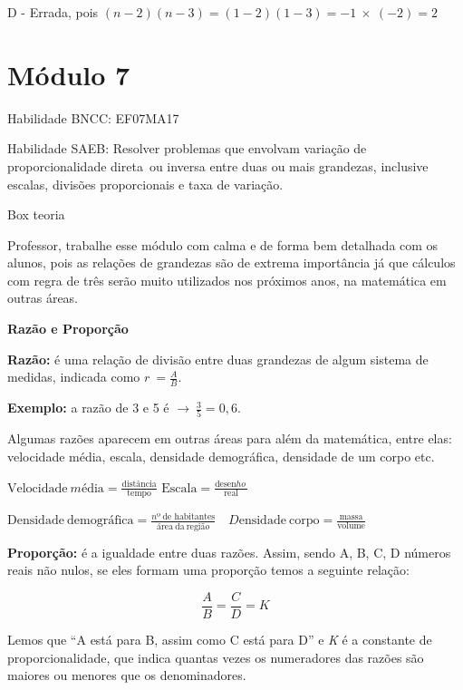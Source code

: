 {{{{{{D - Errada, pois
\(\left( n - 2 \right)\left( n - 3 \right) = \left( 1 - 2 \right)\left( 1 - 3 \right) = - 1\  \times \ ( - 2) = 2\)

\hypertarget{muxf3dulo-7}{%
\section{Módulo 7}

Habilidade BNCC: EF07MA17

Habilidade SAEB: Resolver problemas que envolvam variação de
proporcionalidade direta~ou inversa entre duas ou mais grandezas,
inclusive escalas, divisões proporcionais e taxa de variação.

Box teoria

Professor, trabalhe esse módulo com calma e de forma bem detalhada com
os alunos, pois as relações de grandezas são de extrema importância já
que cálculos com regra de três serão muito utilizados nos próximos anos,
na matemática em outras áreas.

\textbf{Razão e Proporção}

\textbf{{Razão:}} é uma relação de divisão entre duas grandezas de algum
sistema de medidas, indicada como \(r\  = \frac{A}{B}\).

\textbf{Exemplo:} a razão de 3 e 5 é
\(\rightarrow \ \frac{3}{5} = 0,6.\)

Algumas razões aparecem em outras áreas para além da matemática, entre
elas: velocidade média, escala, densidade demográfica, densidade de um
corpo etc.

\(\text{Vel}\text{ocidade}\ mé\text{dia} = \frac{\text{dist}â\text{ncia}}{\text{tempo}}\)
\(\text{Escala} = \frac{\text{desen}ho\ }{\text{real}}\ \)

\(\text{Densidade}\ \text{demogr}á\text{fica} = \frac{nº\ \text{de}\text{\ h}\text{abitantes}}{á\text{rea}\ \text{da}\ \text{regi}ão}\)
\(\text{\ \ \ \ \ \ \ \ \ \ \ \ \ \ \ \ \ \ \ \ \ \ \ \ \ }D\text{ensidade}\ \text{corpo} = \frac{\text{massa}}{\text{volume}}\)

\textbf{{Proporção:}} é a igualdade entre duas razões. Assim, sendo A,
B, C, D números reais não nulos, se eles formam uma proporção temos a
seguinte relação:

\[\frac{A}{B} = \frac{C}{D} = K\]

Lemos que ``A está para B, assim como C está para D'' e \emph{K} é a
constante de proporcionalidade, que indica quantas vezes os numeradores
das razões são maiores ou menores que os denominadores.

}}}}}}}
